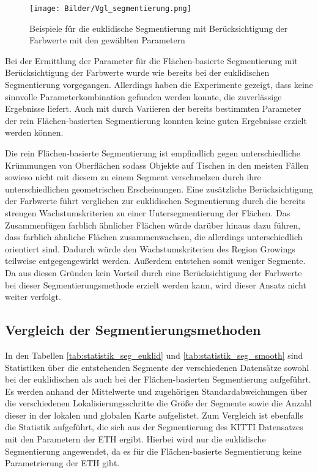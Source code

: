 \begin{figure}[htb]
	\centering
	\texttt{[image: Bilder/Vgl\_segmentierung.png]}
	\caption{Beispiele für die euklidische Segmentierung mit Berücksichtigung der Farbwerte mit den gewählten Parametern}
	\label{fig:rgb}
\end{figure}

Bei der Ermittlung der Parameter für die Flächen-basierte Segmentierung mit Berücksichtigung der Farbwerte wurde wie bereits bei der euklidischen Segmentierung vorgegangen. Allerdings haben die Experimente gezeigt, dass keine sinnvolle Parameterkombination gefunden werden konnte, die zuverlässige Ergebnisse liefert. Auch mit durch Variieren der bereits bestimmten Parameter der rein Flächen-basierten Segmentierung konnten keine guten Ergebnisse erzielt werden können. 

Die rein Flächen-basierte Segmentierung ist empfindlich gegen unterschiedliche Krümmungen von Oberflächen sodass Objekte auf Tischen  in den meisten Fällen sowieso nicht mit diesem zu einem Segment verschmelzen durch ihre unterschiedlichen geometrischen Erscheinungen. Eine zusätzliche Berücksichtigung der Farbwerte führt verglichen zur euklidischen Segmentierung durch die bereits strengen Wachstumskriterien zu einer Untersegmentierung der Flächen. Das Zusammenfügen farblich ähnlicher Flächen würde darüber hinaus dazu führen, dass farblich ähnliche Flächen zusammenwachsen, die allerdings unterschiedlich  orientiert sind. Dadurch würde den Wachs\-tums\-kri\-te\-ri\-en des Region Growings teilweise entgegengewirkt werden. Außerdem entstehen somit weniger Segmente. Da aus diesen Gründen kein Vorteil durch eine Berücksichtigung der Farbwerte bei dieser Segmentierungsmethode erzielt werden kann, wird dieser Ansatz nicht weiter verfolgt. 

\subsection[Vergleich der Segmentierungsmethoden (Kopp)]{Vergleich der Segmentierungsmethoden}
\label{sec:vgl_segmentierung}

In den Tabellen \ref{tab:statistik_seg_euklid} und \ref{tab:statistik_seg_smooth} sind Statistiken über die entstehenden Segmente der verschiedenen Datensätze sowohl bei der euklidischen als auch bei der Flächen-basierten Segmentierung aufgeführt. Es werden anhand der Mittelwerte und zugehörigen Standardabweichungen über die verschiedenen Lokalisierungsschritte die Größe der Segmente sowie die Anzahl dieser in der lokalen und globalen Karte aufgelistet. Zum Vergleich ist ebenfalls die Statistik aufgeführt, die sich aus der Segmentierung des KITTI Datensatzes mit den Parametern der ETH ergibt. Hierbei wird nur die eu\-kli\-disch\-e Segmentierung angewendet, da es für die Flächen-basierte Segmentierung keine Parametrierung der ETH gibt.  

